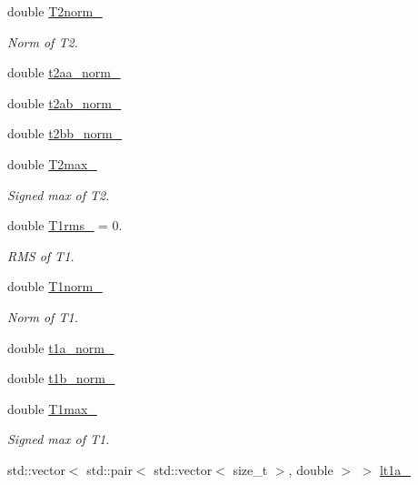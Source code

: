 \begin{DoxyCompactItemize}
double \mbox{\hyperlink{classforte_1_1_m_r_d_s_r_g_a589cd2438cf0433d990a48b5e20e9c74}{T2norm\+\_\+}}
\begin{DoxyCompactList}\small\item\em Norm of T2. \end{DoxyCompactList}\item 
double \mbox{\hyperlink{classforte_1_1_m_r_d_s_r_g_a55d70aca27ec063c5f4e3936934e5ccc}{t2aa\+\_\+norm\+\_\+}}
\item 
double \mbox{\hyperlink{classforte_1_1_m_r_d_s_r_g_a282ebb85f63f88249aae2bf84a05a2ef}{t2ab\+\_\+norm\+\_\+}}
\item 
double \mbox{\hyperlink{classforte_1_1_m_r_d_s_r_g_afeddabe0a280849646ad78bee16940dd}{t2bb\+\_\+norm\+\_\+}}
\item 
double \mbox{\hyperlink{classforte_1_1_m_r_d_s_r_g_a8ac81a8357b3c16402bfd0ddd873ba65}{T2max\+\_\+}}
\begin{DoxyCompactList}\small\item\em Signed max of T2. \end{DoxyCompactList}\item 
double \mbox{\hyperlink{classforte_1_1_m_r_d_s_r_g_ab7aa8197c318cada2b8c844bde4ba60f}{T1rms\+\_\+}} = 0.
\begin{DoxyCompactList}\small\item\em R\+MS of T1. \end{DoxyCompactList}\item 
double \mbox{\hyperlink{classforte_1_1_m_r_d_s_r_g_ae5cf77024172b8e64290bf66fb29b61a}{T1norm\+\_\+}}
\begin{DoxyCompactList}\small\item\em Norm of T1. \end{DoxyCompactList}\item 
double \mbox{\hyperlink{classforte_1_1_m_r_d_s_r_g_a7d3823542fbf9e92401e9abe12bca317}{t1a\+\_\+norm\+\_\+}}
\item 
double \mbox{\hyperlink{classforte_1_1_m_r_d_s_r_g_a34a801febd8f13b8332707cc12eccb7a}{t1b\+\_\+norm\+\_\+}}
\item 
double \mbox{\hyperlink{classforte_1_1_m_r_d_s_r_g_aa9995ae54f3211e33064f1f060e7e730}{T1max\+\_\+}}
\begin{DoxyCompactList}\small\item\em Signed max of T1. \end{DoxyCompactList}\item 
std\+::vector$<$ std\+::pair$<$ std\+::vector$<$ size\+\_\+t $>$, double $>$ $>$ \mbox{\hyperlink{classforte_1_1_m_r_d_s_r_g_ae9795e9f6c09e586d01a8e2b33395609}{lt1a\+\_\+}}

\end{DoxyCompactItemize}

